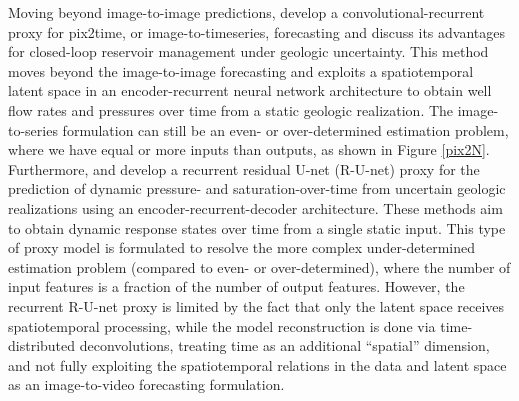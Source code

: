 \documentclass[10pt, twoside]{article}
\begin{document}
Moving beyond image-to-image predictions, \citet{Kim2023} develop a convolutional-recurrent proxy for pix2time, or image-to-timeseries, forecasting and discuss its advantages for closed-loop reservoir management under geologic uncertainty. This method moves beyond the image-to-image forecasting and exploits a spatiotemporal latent space in an encoder-recurrent neural network architecture to obtain well flow rates and pressures over time from a static geologic realization. The image-to-series formulation can still be an even- or over-determined estimation problem, where we have equal or more inputs than outputs, as shown in Figure \ref{pix2N}. Furthermore, \citet{Tang2020, Tang2021} and \citet{Jiang2023} develop a recurrent residual U-net (R-U-net) proxy for the prediction of dynamic pressure- and saturation-over-time from uncertain geologic realizations using an encoder-recurrent-decoder architecture. These methods aim to obtain dynamic response states over time from a single static input. This type of proxy model is formulated to resolve the more complex under-determined estimation problem (compared to even- or over-determined), where the number of input features is a fraction of the number of output features. However, the recurrent R-U-net proxy is limited by the fact that only the latent space receives spatiotemporal processing, while the model reconstruction is done via time-distributed deconvolutions, treating time as an additional “spatial” dimension, and not fully exploiting the spatiotemporal relations in the data and latent space as an image-to-video forecasting formulation.
\end{document}
